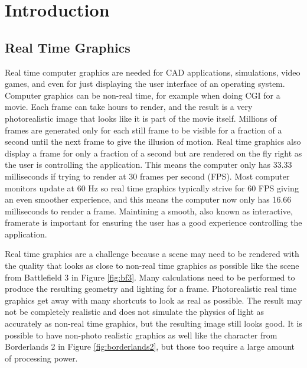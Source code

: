 \documentclass[12pt]{ucthesis}
\begin{document}
\pagestyle{plain}




\renewcommand{\baselinestretch}{1.66}







\chapter{Introduction}
\label{intro}

\section{Real Time Graphics}
\label{real-time-graphics}

Real time computer graphics are needed for CAD applications, simulations, video games, and even for just displaying the user interface of an operating system.
Computer graphics can be non-real time, for example when doing CGI for a movie.
Each frame can take hours to render, and the result is a very photorealistic image that looks like it is part of the movie itself.
Millions of frames are generated only for each still frame to be visible for a fraction of a second until the next frame to give the illusion of motion.
Real time graphics also display a frame for only a fraction of a second but are rendered on the fly right as the user is controlling the application.
This means the computer only has 33.33 milliseconds if trying to render at 30 frames per second (FPS).
Most computer monitors update at 60 Hz so real time graphics typically strive for 60 FPS giving an even smoother experience, and this means the computer now only has 16.66 milliseconds to render a frame.
Maintining a smooth, also known as interactive, framerate is important for ensuring the user has a good experience controlling the application.\cite{Interactive}

Real time graphics are a challenge because a scene may need to be rendered with the quality that looks as close to non-real time graphics as possible like the scene from Battlefield 3 in Figure \ref{fig:bf3}.
Many calculations need to be performed to produce the resulting geometry and lighting for a frame.
Photorealistic real time graphics get away with many shortcuts to look as real as possible.
The result may not be completely realistic and does not simulate the physics of light as accurately as non-real time graphics, but the resulting image still looks good.
It is possible to have non-photo realistic graphics as well like the character from Borderlands 2 in Figure \ref{fig:borderlands2}, but those too require a large amount of processing power.
\end{document}
